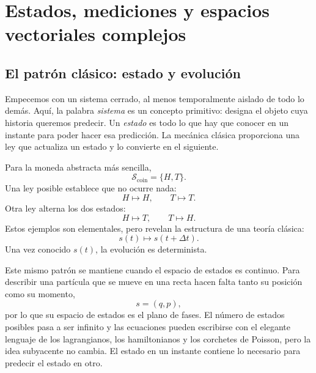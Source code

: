 \chapter{Estados, mediciones y espacios vectoriales complejos}


\section{El patrón clásico: estado y evolución}

Empecemos con un sistema cerrado, al menos temporalmente aislado de todo lo demás. Aquí, la palabra \emph{sistema} es un concepto primitivo: designa el objeto cuya historia queremos predecir. Un \emph{estado} es todo lo que hay que conocer en un instante para poder hacer esa predicción. La mecánica clásica proporciona una ley que actualiza un estado y lo convierte en el siguiente.

Para la moneda abstracta más sencilla,
\begin{equation}
  \mathcal S_{\mathrm{coin}}=\{H,T\}.
\end{equation}
Una ley posible establece que no ocurre nada:
\begin{equation}
  H\longmapsto H,
  \qquad
  T\longmapsto T.
\end{equation}
Otra ley alterna los dos estados:
\begin{equation}
  H\longmapsto T,
  \qquad
  T\longmapsto H.
\end{equation}
Estos ejemplos son elementales, pero revelan la estructura de una teoría clásica:
\begin{equation}
  s(t)\longmapsto s(t+\Delta t).
\end{equation}
Una vez conocido \(s(t)\), la evolución es determinista.

Este mismo patrón se mantiene cuando el espacio de estados es continuo. Para describir una partícula que se mueve en una recta hacen falta tanto su posición como su momento,
\begin{equation}
  s=(q,p),
\end{equation}
por lo que su espacio de estados es el plano de fases. El número de estados posibles pasa a ser infinito y las ecuaciones pueden escribirse con el elegante lenguaje de los lagrangianos, los hamiltonianos y los corchetes de Poisson, pero la idea subyacente no cambia. El estado en un instante contiene lo necesario para predecir el estado en otro.

